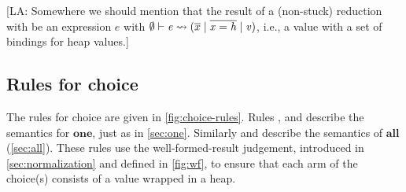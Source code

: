 \documentclass[acmsmall,review,anonymous,dvipsnames]{acmart}
\newcommand{\Varid}[1]{\mathit{#1}}
\newcommand{\lennart}[1]{{\color{dkcyan} [{LA}: #1]}}
\newcommand{\lennart}[1]{}
\begin{document}
%
% 
% 


\lennart{Somewhere we should mention that the result of a (non-stuck) reduction with be an expression \ensuremath{\Varid{e}} with
  $\wff{\emptyset}{\ensuremath{\Varid{e}}}{\ensuremath{\overline{x}}}{\overline{\ensuremath{\Varid{x}} = \ensuremath{\Varid{h}}}}{\ensuremath{\Varid{v}}}$, i.e., a value with a set of bindings for heap values.}

\subsection{Rules for choice} \label{sec:choice-rules}

The rules for choice are given in \cref{fig:choice-rules}.
Rules , 
and  describe the semantics for \ensuremath{\textbf{one}}, just as in \cref{sec:one}.
Similarly  and  describe
the semantics of \ensuremath{\textbf{all}} (\cref{sec:all}).  These rules use the well-formed-result
judgement, introduced in \cref{sec:normalization} and defined in \cref{fig:wf},
to ensure that each arm of the choice(s) consists of a value wrapped in a heap.
\end{document}
